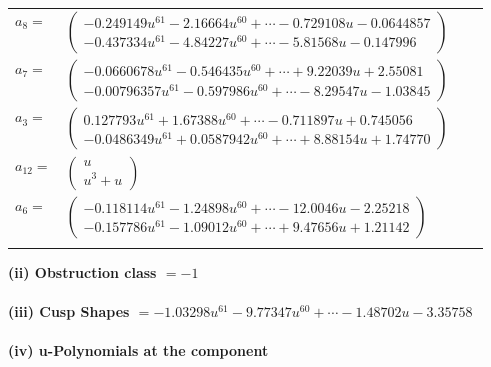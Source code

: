 \documentclass[1p]{elsarticle_modified}
\theoremstyle{definition}
\begin{document}
\begin{tabular}{m{7pt} m{180pt} m{7pt} m{180pt} }
\flushright $a_{8}=$&$\begin{pmatrix}-0.249149 u^{61}-2.16664 u^{60}+\cdots-0.729108 u-0.0644857\\-0.437334 u^{61}-4.84227 u^{60}+\cdots-5.81568 u-0.147996\end{pmatrix}$ \\
\flushright $a_{7}=$&$\begin{pmatrix}-0.0660678 u^{61}-0.546435 u^{60}+\cdots+9.22039 u+2.55081\\-0.00796357 u^{61}-0.597986 u^{60}+\cdots-8.29547 u-1.03845\end{pmatrix}$ \\
\flushright $a_{3}=$&$\begin{pmatrix}0.127793 u^{61}+1.67388 u^{60}+\cdots-0.711897 u+0.745056\\-0.0486349 u^{61}+0.0587942 u^{60}+\cdots+8.88154 u+1.74770\end{pmatrix}$ \\
\flushright $a_{12}=$&$\begin{pmatrix}u\\u^3+u\end{pmatrix}$ \\
\flushright $a_{6}=$&$\begin{pmatrix}-0.118114 u^{61}-1.24898 u^{60}+\cdots-12.0046 u-2.25218\\-0.157786 u^{61}-1.09012 u^{60}+\cdots+9.47656 u+1.21142\end{pmatrix}$\\&\end{tabular}
\flushleft \textbf{(ii) Obstruction class $= -1$}\\~\\
\flushleft \textbf{(iii) Cusp Shapes $= -1.03298 u^{61}-9.77347 u^{60}+\cdots-1.48702 u-3.35758$}\\~\\
\newpage\renewcommand{\arraystretch}{1}
\flushleft \textbf{(iv) u-Polynomials at the component}\newline \\
\end{document}
